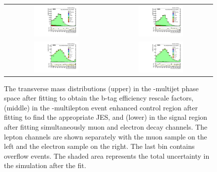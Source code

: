 \begin{figure}[htb]
\caption[Three-step fitting procedure for \wbb measurement]{
 The transverse mass distributions (upper) in the \ttbar-multijet
  phase space after fitting to obtain the b-tag efficiency rescale factors,
  (middle) in the \ttbar-multilepton event enhanced control region
  after fitting to find the appropriate JES,
  and (lower) in the \wbb signal region
  after fitting simultaneously muon and electron decay channels.
 The lepton channels are shown separately with the muon
  sample on the left and the electron sample on the right.
 The last bin contains overflow events.
 The shaded area represents the total uncertainty in the simulation after the fit.
 }
\begin{centering}
\begin{tabular}{cc}
\includegraphics[width=0.45\textwidth]{pdfs/wbbxc/pape/poststep1_ttjjj_mt_mu} & 
\includegraphics[width=0.45\textwidth]{pdfs/wbbxc/pape/poststep1_ttjjj_mt_ele} \\
\includegraphics[width=0.45\textwidth]{pdfs/wbbxc/pape/poststep2_ttme_mt_mu} & 
\includegraphics[width=0.45\textwidth]{pdfs/wbbxc/pape/poststep2_ttme_mt_ele} \\

\end{tabular}
\end{centering}
\end{figure}
